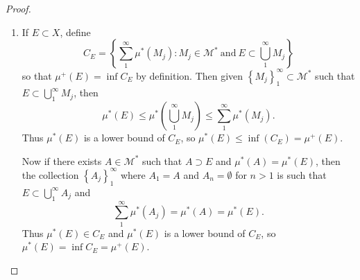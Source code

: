 \documentclass{article}
\theoremstyle{definition}
\begin{document}
\begin{proof}\
	\begin{enumerate}[label=\textbf{\alph*.}]
		\item If $E \subset X$, define \begin{equation*}
			      C_E = \left\lbrace \sum_1^\infty \mu^*(M_j) : M_j \in \mathscr{M}^*\ \mathrm{and}\ E \subset \bigcup_1^\infty M_j \right\rbrace
		      \end{equation*}
		      so that $\mu^+(E) = \inf C_E$ by definition.
		      Then given $\left\lbrace M_j \right\rbrace_1^\infty \subset \mathscr{M}^*$ such that $E \subset \bigcup_1^\infty M_j$, then \begin{equation*}
			      \mu^*(E) \leq \mu^*\left(\bigcup_1^\infty M_j \right) \leq \sum_1^\infty \mu^*(M_j).
		      \end{equation*}
		      Thus $\mu^*(E)$ is a lower bound of $C_E$, so $\mu^*(E) \leq \inf(C_E) = \mu^+(E)$.

		      Now if there exists $A \in \mathscr{M}^*$ such that $A \supset E$ and $\mu^*(A) = \mu^*(E)$, then the collection $\left\lbrace A_j \right\rbrace_1^\infty$ where $A_1 = A$ and $A_n = \emptyset$ for $n > 1$ is such that $E \subset \bigcup_1^\infty A_j$ and \begin{equation*}
			      \sum_1^\infty \mu^*(A_j) = \mu^*(A) = \mu^*(E).
		      \end{equation*}
		      Thus $\mu^*(E) \in C_E$ and $\mu^*(E)$ is a lower bound of $C_E$, so $\mu^*(E) = \inf C_E = \mu^+(E)$.


\end{enumerate}
\end{proof}
\end{document}
